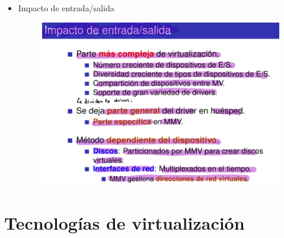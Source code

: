 \documentclass[12pt, twoside, openright]{report} %
\begin{document}
\begin{itemize}
\begin{figure}[H]
    \end{figure}
  \item
    Impacto de entrada/salida
    \begin{figure}[H]
      {\includegraphics[scale=.4]{Untitled 38.png}}
    \end{figure}
  \end{itemize}
\pagebreak
\section{Tecnologías de virtualización}
\end{document}
